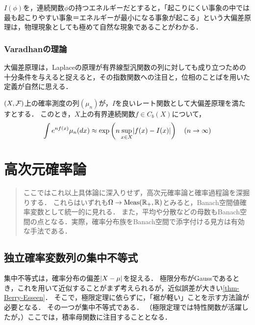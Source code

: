 \documentclass[uplatex,dvipdfmx]{jsreport}
\begin{document}
\begin{tcolorbox}[colframe=ForestGreen, colback=ForestGreen!10!white,breakable,colbacktitle=ForestGreen!40!white,coltitle=black,fonttitle=\bfseries\sffamily,
title=確率過程に関する大偏差原理]
    $I(\phi)$を，連続関数$\phi$の持つエネルギーだとすると，「起こりにくい事象の中では最も起こりやすい事象＝エネルギーが最小になる事象が起こる」という大偏差原理は，物理現象としても極めて自然な現象であることがわかる．
\end{tcolorbox}

\subsection{Varadhanの理論}

\begin{tcolorbox}[colframe=ForestGreen, colback=ForestGreen!10!white,breakable,colbacktitle=ForestGreen!40!white,coltitle=black,fonttitle=\bfseries\sffamily,
title=]
    大偏差原理は，Laplaceの原理が有界線型汎関数の列に対しても成り立つための十分条件を与えると捉えると，その指数関数への注目と，位相のことばを用いた定義が自然に思える．
\end{tcolorbox}

\begin{lemma}
    $(X,\mathcal{F})$上の確率測度の列$(\mu_n)$が，$I$を良いレート関数として大偏差原理を満たすとする．
    このとき，$X$上の有界連続関数$f\in C_b(X)$について，
    \[\int e^{nf(x)}\mu_n(dx)\approx\exp\left(n\sup_{x\in X}\lvert f(x)-I(x)\rvert\right)\quad(n\to\infty)\]
\end{lemma}


\chapter{高次元確率論}

\begin{quotation}
    ここではこれ以上具体論に深入りせず，高次元確率論と確率過程論を深掘りする．
    これらはいずれも$\Omega\to\mathrm{Meas}(\mathbb{R}_+,\mathbb{R})$とみると，Banach空間値確率変数として統一的に見れる．
    また，平均や分散などの母数もBanach空間の点となる．実際，確率分布族をBanach空間で添字付ける見方は有効な手法である．
\end{quotation}

\section{独立確率変数列の集中不等式}

\begin{tcolorbox}[colframe=ForestGreen, colback=ForestGreen!10!white,breakable,colbacktitle=ForestGreen!40!white,coltitle=black,fonttitle=\bfseries\sffamily,
title=]
    集中不等式は，確率分布の偏差$\lvert X-\mu\rvert$を捉える．
    極限分布がGaussであるとき，これを用いて近似することがまず考えられるが，近似誤差が大きい\ref{thm-Berry-Esseen}．
    そこで，極限定理に依らずに，「裾が軽い」ことを示す方法論が必要となる．
    その一つが集中不等式である．
    （極限定理では特性関数が活躍したが，）ここでは，積率母関数に注目することとなる．
\end{tcolorbox}
\end{document}

